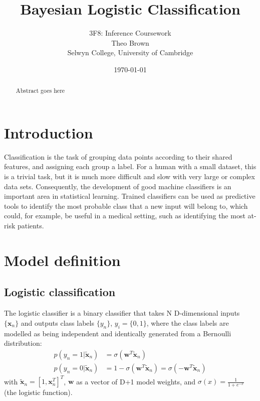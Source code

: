 \documentclass[a4paper]{article}
\begin{document}
    \title{Bayesian Logistic Classification}
    \author{3F8: Inference Coursework \\ Theo Brown \\ Selwyn College, University of Cambridge}
    \date{\today}
    \maketitle

    \begin{abstract}
        Abstract goes here
    \end{abstract}

    \tableofcontents

    \section{Introduction}\label{sec:introduction}
  Classification is the task of grouping data points according to their shared features, and assigning each group a label.
  For a human with a small dataset, this is a trivial task, but it is much more difficult and slow with very large or complex data sets.
  Consequently, the development of good machine classifiers is an important area in statistical learning.
  Trained classifiers can be used as predictive tools to identify the most probable class that a new input will belong to, which could, for example, be useful in a medical setting, such as identifying the most at-risk patients.

    \section{Model definition}\label{sec:model-definition}
    \subsection{Logistic classification}
    The logistic classifier is a binary classifier that takes N D-dimensional inputs $\{\bm{x}_n\}$ and outputs class labels $\{y_n\}$, $y_i = \{0, 1\}$, where the class labels are modelled as being independent and identically generated from a Bernoulli distribution:
    \begin{align}
        p(y_n = 1 | \tilde{\bm{x}}_n) &= \sigma (\bm{w}^T\tilde{\bm{x}}_n) \nonumber \\
        p(y_n = 0 | \tilde{\bm{x}}_n) &= 1 - \sigma (\bm{w}^T\tilde{\bm{x}}_n) = \sigma (-\bm{w}^T\tilde{\bm{x}}_n)
        \label{eq:logistic-classifier}
    \end{align}
    with $\tilde{\bm{x}}_n = \left[1, \bm{x}_n^T \right]^T$, $\bm{w}$ as a vector of D+1 model weights, and $\sigma(x) = \frac{1}{1 + e^{-x}}$ (the logistic function).
\end{document}
